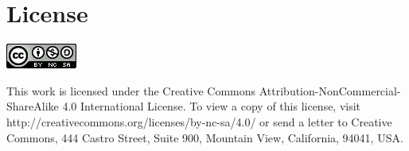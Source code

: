 \chapter{License}



\begin{center}
 \includegraphics{images/cc_logo.png}
 
 
 
This work is licensed under the Creative Commons 
Attribution-NonCommercial-ShareAlike 4.0 International License. To view a copy 
of this license, visit http://creativecommons.org/licenses/by-nc-sa/4.0/ or send 
a letter to Creative Commons, 444 Castro Street, Suite 900, Mountain View, 
California, 94041, USA.

\end{center}

\begin{verbatim}

\end{verbatim}